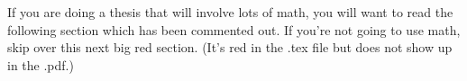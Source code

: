 \documentclass[12pt,twoside]{reedthesis}
\begin{document}
        If you are doing a thesis that will involve lots of math, you will want to read the following section which has been commented out. If you're not going to use math, skip over this next big red section. (It's red in the .tex file but does not show up in the .pdf.)
%




%



%



%




\end{document}
